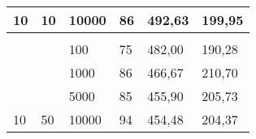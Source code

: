 \documentclass{article}
\begin{document}
\begin{table}[h]
\begin{tabular}{llllll}
			\multicolumn{1}{|l|}{\multirow{-4}{*}{10}}                             & \multicolumn{1}{l|}{\multirow{-4}{*}{10}}                             & \multicolumn{1}{l|}{10000}                                                & \multicolumn{1}{l|}{86}                                                      & \multicolumn{1}{l|}{492,63}                                                         & \multicolumn{1}{l|}{199,95}                                                           \\ \hline
			&                                                                       &                                                                           &                                                                              &                                                                                     &                                                                                       \\ \hline
			\multicolumn{1}{|l|}{}                                                 & \multicolumn{1}{l|}{}                                                 & \multicolumn{1}{l|}{100}                                                  & \multicolumn{1}{l|}{75}                                                      & \multicolumn{1}{l|}{482,00}                                                         & \multicolumn{1}{l|}{190,28}                                                           \\ \cline{3-6} 
			\multicolumn{1}{|l|}{}                                                 & \multicolumn{1}{l|}{}                                                 & \multicolumn{1}{l|}{1000}                                                 & \multicolumn{1}{l|}{86}                                                      & \multicolumn{1}{l|}{466,67}                                                         & \multicolumn{1}{l|}{210,70}                                                           \\ \cline{3-6} 
			\multicolumn{1}{|l|}{}                                                 & \multicolumn{1}{l|}{}                                                 & \multicolumn{1}{l|}{5000}                                                 & \multicolumn{1}{l|}{85}                                                      & \multicolumn{1}{l|}{455,90}                                                         & \multicolumn{1}{l|}{205,73}                                                           \\ \cline{3-6} 
			\multicolumn{1}{|l|}{\multirow{-4}{*}{10}}                             & \multicolumn{1}{l|}{\multirow{-4}{*}{50}}                             & \multicolumn{1}{l|}{10000}                                                & \multicolumn{1}{l|}{94}                                                      & \multicolumn{1}{l|}{454,48}                                                         & \multicolumn{1}{l|}{204,37}                                                           \\ \hline

\end{tabular}
\end{table}
\end{document}
